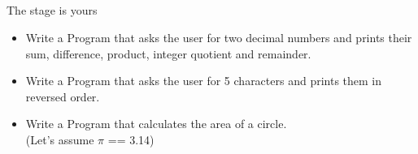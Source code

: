 \subsection{}
\begin{frame}{The stage is yours}
	\begin{itemize}
		\item Write a Program that asks the user for two decimal numbers and prints their sum, difference, product, integer quotient and remainder.
		\item Write a Program that asks the user for 5 characters and prints them in reversed order.
		\item Write a Program that calculates the area of a circle.\\(Let's assume $\pi$ == 3.14)
	\end{itemize}
\end{frame}


